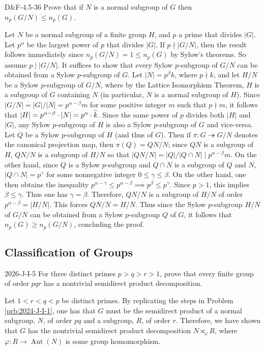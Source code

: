 \documentclass{article}
\begin{document}
	\begin{prb}{D\&F-4.5-36}
		Prove that if $N$ is a normal subgroup of $G$ then $n_{p}(G/N) \leq n_{p}(G)$. 
	\end{prb}
	Let $N$ be a normal subgroup of a finite group $H$, and $p$ a prime that divides $|G|$. Let $p^{\alpha}$ be the largest power of $p$ that divides $|G|$. If $p \nmid |G/N|$, then the result follows immediately since $n_{p}(G/N) = 1 \leq n_{p}(G)$ by Sylow's theorems. So assume $p \mid |G/N|$. It suffices to show that every Sylow $p$-subgroup of $G/N$ can be obtained from a Sylow $p$-subgroup of $G$. Let $|N| = p^{\beta}k$, where $p \nmid k$, and let $H/N$ be a Sylow $p$-subgroup of $G/N$, where by the Lattice Isomorphism Theorem, $H$ is a subgroup of $G$ containing $N$ (in particular, $N$ is a normal subgroup of $H$). Since $|G/N| = |G|/|N| = p^{\alpha - \beta}m$ for some positive integer $m$ such that $p \nmid m$, it follows that $|H| = p^{\alpha - \beta}\cdot |N| = p^{\alpha} \cdot \widetilde{k}$. Since the same power of $p$ divides both $|H|$ and $|G|$, any Sylow $p$-subgroup of $H$ is also a Sylow $p$-subgroup of $G$ and vice-versa. Let $Q$ be a Sylow $p$-subgroup of $H$ (and thus of $G$). Then if $\pi: G \twoheadrightarrow G/N$ denotes the canonical projection map, then $\pi(Q) = QN/N$; since $QN$ is a subgroup of $H$, $QN/N$ is a subgroup of $H/N$ so that $|QN/N| = |Q|/|Q \cap N| \mid p^{\alpha - \beta}m$. On the other hand, since $Q$ is a Sylow $p$-subgroup and $Q \cap N$ is a subgroup of $Q$ and $N$, $|Q \cap N| = p^{\gamma}$ for some nonnegative integer $0 \leq \gamma \leq \beta$. On the other hand, one then obtains the inequality $p^{\alpha- \gamma} \leq p^{\alpha -\beta} \implies p^{\beta} \leq p^{\gamma}$. Since $p > 1$, this implies $\beta \leq \gamma$. Thus one has $\gamma = \beta$. Therefore, $QN/N$ is a subgroup of $H/N$ of order $p^{\alpha - \beta} = |H/N|$. This forces $QN/N = H/N$. Thus since the Sylow $p$-subgroup $H/N$ of $G/N$ can be obtained from a Sylow $p$-subgroup $Q$ of $G$, it follows that $n_{p}(G) \geq n_{p}(G/N)$, concluding the proof. 
	
	\subsection{Classification of Groups}
	
	\begin{prb}{2026-J-I-5}
		For three distinct primes $p > q > r > 1$, prove that every finite group of order $pqr$ has a nontrivial semidirect product decomposition. 
	\end{prb}
	Let $1 < r < q < p$ be distinct primes. By replicating the steps in Problem \ref{prb:2024-J-I-1}, one has that $G$ must be the semidirect product of a normal subgroup, $N$, of order $pq$ and a subgroup, $R$, of order $r$. Therefore, we have shown that $G$ has the nontrivial semidirect product decomposition $N \rtimes_{\varphi} R$, where $\varphi: R \to \operatorname{Aut}(N)$ is some group homomorphism. 
	
\end{document}
